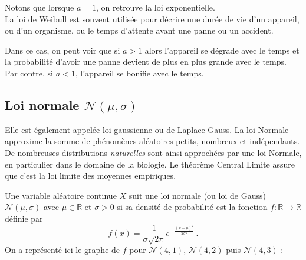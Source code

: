 \documentclass[12pt, a4paper]{book}
\numberwithin{equation}{section}
\begin{document}
Notons que lorsque $a=1$, on retrouve la loi exponentielle.\\

La loi de Weibull est souvent utilisée pour décrire une durée de vie d'un appareil, ou d'un organisme,
ou le temps d'attente avant une panne ou un accident. 

Dans ce cas, on peut voir que si $a>1$ alors l'appareil se dégrade avec le temps et la probabilité d'avoir une panne
devient de plus en plus grande avec le temps. Par contre, si $a<1$, l'appareil se bonifie avec le temps.


\subsection[Loi normale]{Loi normale $\mathcal{N}(\mu,\sigma)$}
Elle est également appelée loi gaussienne ou de Laplace-Gauss. La loi Normale approxime la somme de
phénomènes aléatoires petits, nombreux et indépendants. De nombreuses distributions {\it naturelles}
sont ainsi approchées par une loi Normale, en particulier dans le domaine de la biologie.  Le théorème Central Limite assure que c'est la loi limite des moyennes empiriques. %

Une variable aléatoire continue $X$ suit une loi normale (ou loi de Gauss) $\mathcal{N}(\mu,\sigma)$ avec
$\mu\in \mathbb{R}$ et $\sigma>0$ si sa densité de probabilité est la 
fonction $f:\mathbb{R}\longrightarrow \mathbb{R}$ définie par  
$$
f(x)=\frac{1}{\sigma\sqrt{2\pi}} e^{-\frac{(x-\mu)^2}{2\sigma^2}}\,.
$$
On a représenté ici le graphe de $f$ pour $\mathcal{N}(4,1)$, $\mathcal{N}(4,2)$  puis $\mathcal{N}(4,3)$ : \\



\begin{center}
\end{center}
\end{document}
